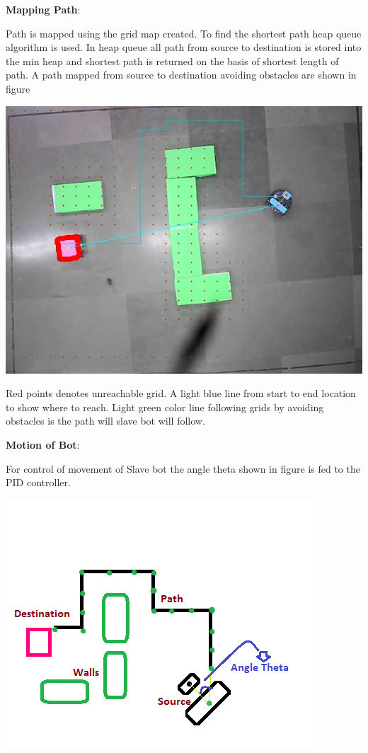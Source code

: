 \documentclass[report]{res}
\begin{document}
	\pagebreak	
	
	
	\textbf{Mapping Path}:
	
	Path is mapped using the grid map created. To find the shortest path heap queue algorithm is used. In heap queue all path from source to destination is stored into the min heap and shortest path is returned on the basis of shortest length of path. A path mapped from source to destination avoiding obstacles are shown in figure\\
	
	\begin{center}
		\includegraphics[scale = 0.7]{graphics/case1/path_route.jpeg}\\
	\end{center}
	
	Red points denotes unreachable grid. A light blue line from start to end location to show where to reach. Light green color line following grids by avoiding obstacles is the path will slave bot will follow.
	
	\pagebreak
	
	
	\textbf{Motion of Bot}:
	
	For control of movement of Slave bot the angle theta shown in figure is fed to the PID controller.
	
	\begin{center}
		\includegraphics[scale = 1.4]{graphics/pid_error.png}\\
	\end{center}
	
\end{document}
